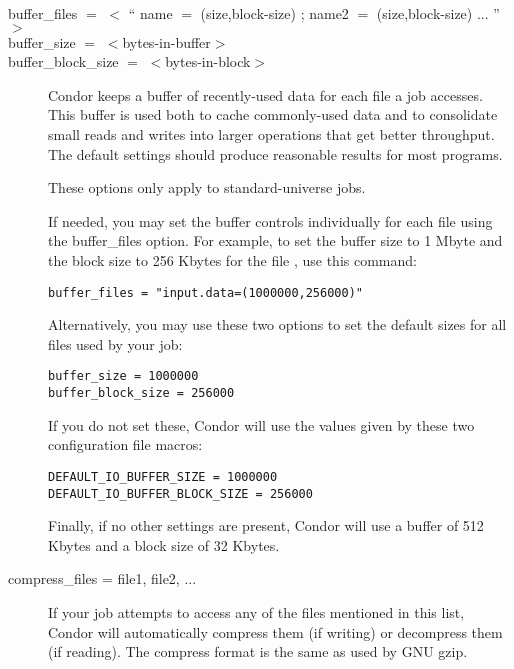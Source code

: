 \begin{description}

\item[buffer\_files $=$ $<$ `` name $=$ (size,block-size) ; name2 $=$ (size,block-size) ... '' $>$ ]
\item[buffer\_size $=$ $<$bytes-in-buffer$>$]
\item[buffer\_block\_size $=$ $<$bytes-in-block$>$]
Condor keeps a buffer of recently-used data for each file a job accesses.
This buffer is used both to cache commonly-used data and to consolidate small
reads and writes into larger operations that get better throughput.
The default settings should produce reasonable results for most programs.

These options only apply to standard-universe jobs.

If needed, you may set the buffer controls individually for each file using
the buffer\_files option. For example, to set the buffer size to 1 Mbyte and
the block size to 256 Kbytes for the file , use this command:

\begin{verbatim}
buffer_files = "input.data=(1000000,256000)"
\end{verbatim}

Alternatively, you may use these two options to set
the default sizes for all files used by your job:

\begin{verbatim}
buffer_size = 1000000
buffer_block_size = 256000
\end{verbatim}

If you do not set these, Condor will use the values given by these
two configuration file macros:

\begin{verbatim}
DEFAULT_IO_BUFFER_SIZE = 1000000
DEFAULT_IO_BUFFER_BLOCK_SIZE = 256000
\end{verbatim}

Finally, if no other settings are present, Condor will use
a buffer of 512 Kbytes
and a block size of 32 Kbytes.


\item[compress\_files = file1, file2, ...]

If your job attempts to access any of the files mentioned in this list,
Condor will automatically compress them (if writing) or decompress them (if reading).
The compress format is the same as used by GNU gzip.


\end{description}
